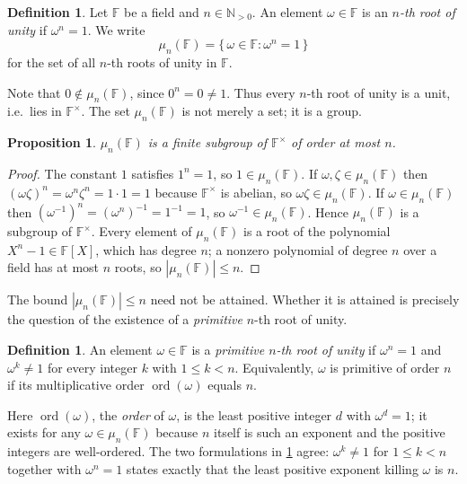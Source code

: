 \documentclass[11pt,a4paper]{article}
\newtheorem{proposition}[theorem]{Proposition}
\theoremstyle{definition}
\newtheorem{definition}[theorem]{Definition}
\theoremstyle{remark}
\newcommand{\N}{\ensuremath{\mathbb{N}}}
\newcommand{\F}{\ensuremath{\mathbb{F}}}
\DeclareMathOperator{\ord}{ord}
\begin{document}
\begin{definition}\label{rootsofunity:def-root}
Let \(\F\) be a field and \(n \in \N_{>0}\). An element \(\omega \in \F\) is an \emph{\(n\)-th root of unity} if \(\omega^n = 1\). We write
\[
  \mu_n(\F) = \{\,\omega \in \F : \omega^n = 1\,\}
\]
for the set of all \(n\)-th roots of unity in \(\F\).
\end{definition}

Note that \(0 \notin \mu_n(\F)\), since \(0^n = 0 \ne 1\). Thus every \(n\)-th root of unity is a unit, i.e.\ lies in \(\F^\times\). The set \(\mu_n(\F)\) is not merely a set; it is a group.

\begin{proposition}\label{rootsofunity:prp-group}
\(\mu_n(\F)\) is a finite subgroup of \(\F^\times\) of order at most \(n\).
\end{proposition}

\begin{proof}
The constant \(1\) satisfies \(1^n = 1\), so \(1 \in \mu_n(\F)\). If \(\omega, \zeta \in \mu_n(\F)\) then \((\omega\zeta)^n = \omega^n \zeta^n = 1\cdot 1 = 1\) because \(\F^\times\) is abelian, so \(\omega\zeta \in \mu_n(\F)\). If \(\omega \in \mu_n(\F)\) then \((\omega^{-1})^n = (\omega^n)^{-1} = 1^{-1} = 1\), so \(\omega^{-1} \in \mu_n(\F)\). Hence \(\mu_n(\F)\) is a subgroup of \(\F^\times\). Every element of \(\mu_n(\F)\) is a root of the polynomial \(X^n - 1 \in \F[X]\), which has degree \(n\); a nonzero polynomial of degree \(n\) over a field has at most \(n\) roots, so \(|\mu_n(\F)| \le n\).
\end{proof}

The bound \(|\mu_n(\F)| \le n\) need not be attained. Whether it is attained is precisely the question of the existence of a \emph{primitive} \(n\)-th root of unity.

\begin{definition}\label{rootsofunity:def-primitive}
An element \(\omega \in \F\) is a \emph{primitive \(n\)-th root of unity} if \(\omega^n = 1\) and \(\omega^k \ne 1\) for every integer \(k\) with \(1 \le k < n\). Equivalently, \(\omega\) is primitive of order \(n\) if its multiplicative order \(\ord(\omega)\) equals \(n\).
\end{definition}

Here \(\ord(\omega)\), the \emph{order} of \(\omega\), is the least positive integer \(d\) with \(\omega^d = 1\); it exists for any \(\omega \in \mu_n(\F)\) because \(n\) itself is such an exponent and the positive integers are well-ordered. The two formulations in \cref{rootsofunity:def-primitive} agree: \(\omega^k \ne 1\) for \(1 \le k < n\) together with \(\omega^n = 1\) states exactly that the least positive exponent killing \(\omega\) is \(n\).
\end{document}
